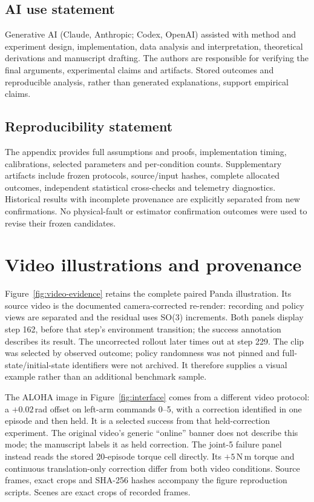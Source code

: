 \documentclass{article}
\begin{document}
\subsection*{AI use statement}
Generative AI (Claude, Anthropic; Codex, OpenAI) assisted with method and experiment design,
implementation, data analysis and interpretation, theoretical derivations and manuscript drafting. The authors are responsible for verifying
the final arguments, experimental claims and artifacts. Stored outcomes and reproducible
analysis, rather than generated explanations, support empirical claims.

\subsection*{Reproducibility statement}
The appendix provides full assumptions and proofs, implementation timing, calibrations,
selected parameters and per-condition counts. Supplementary artifacts include frozen
protocols, source/input hashes, complete allocated outcomes, independent statistical
cross-checks and telemetry diagnostics. Historical results with incomplete provenance are
explicitly separated from new confirmations. No physical-fault or estimator confirmation
outcomes were used to revise their frozen candidates.



\clearpage
\appendix


\section{Video illustrations and provenance}\label{app:videos}
Figure~\ref{fig:video-evidence} retains the complete paired Panda illustration.
Its source video is the documented camera-corrected re-render: recording and policy views
are separated and the residual uses SO(3) increments. Both panels display step 162, before
that step's environment transition; the success annotation describes its result. The
uncorrected rollout later times out at step 229. The clip was selected by observed outcome;
policy randomness was not pinned and full-state/initial-state identifiers were not archived.
It therefore supplies a visual example rather than an additional benchmark sample.

The ALOHA image in Figure~\ref{fig:interface} comes from a different video protocol:
a $+0.02$\,rad offset on left-arm commands 0--5, with a correction identified in one episode
and then held. It is a selected success from that held-correction experiment. The original
video's generic ``online'' banner does not describe this mode; the manuscript labels it
as held correction. The joint-5 failure panel instead reads the stored 20-episode torque
cell directly. Its $+5$\,N\,m torque and continuous translation-only correction differ from
both video conditions. Source frames, exact crops and SHA-256 hashes accompany the figure
reproduction scripts. Scenes are exact crops of recorded frames.
\end{document}

